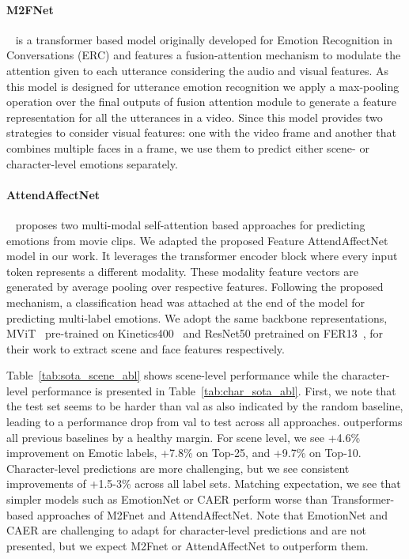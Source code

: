 \paragraph{M2FNet}~\cite{m2fnet}
is a transformer based model originally developed for Emotion Recognition in Conversations (ERC) and features a fusion-attention mechanism to modulate the attention given to each utterance considering the audio and visual features.
As this model is designed for utterance emotion recognition we apply a max-pooling operation over the final outputs of fusion attention module to generate a feature representation for all the utterances in a video.
Since this model provides two strategies to consider visual features: one with the video frame and another that combines multiple faces in a frame, we use them to predict either scene- or character-level emotions separately.

\paragraph{AttendAffectNet}~\cite{attendaffectnet}
proposes two multi-modal self-attention based approaches for predicting emotions from movie clips. We adapted the proposed Feature AttendAffectNet model in our work.
It leverages the transformer encoder block where every input token represents a different modality. These modality feature vectors are generated by average pooling over respective features. Following the proposed mechanism, a classification head was attached at the end of the model for predicting multi-label emotions.
We adopt the same backbone representations, MViT~\cite{FanMViT2021} pre-trained on Kinetics400~\cite{CarreiraQuoVadis2017} and ResNet50 pretrained on FER13~\cite{fer13}, for their work to extract scene and face features respectively.

Table~\ref{tab:sota_scene_abl} shows scene-level performance while the character-level performance is presented in Table~\ref{tab:char_sota_abl}.
First, we note that the test set seems to be harder than val as also indicated by the random baseline, leading to a performance drop from val to test across all approaches.
\modelname{} outperforms all previous baselines by a healthy margin.
For scene level, we see +4.6\% improvement on Emotic labels, +7.8\% on Top-25, and +9.7\% on Top-10.
Character-level predictions are more challenging, but we see consistent improvements of +1.5-3\% across all label sets.
Matching expectation, we see that simpler models such as EmotionNet or CAER perform worse than Transformer-based approaches of M2Fnet and AttendAffectNet.
Note that EmotionNet and CAER are challenging to adapt for character-level predictions and are not presented, but we expect M2Fnet or AttendAffectNet to outperform them.
